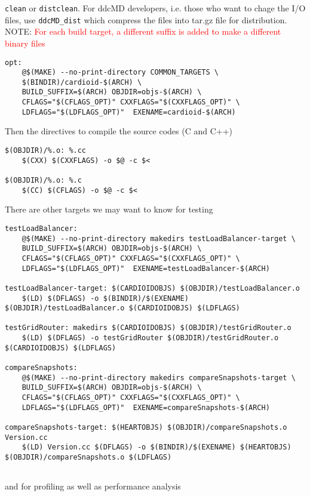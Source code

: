 \verb!clean! or \verb!distclean!. For ddcMD developers, i.e. those who want to
chage the I/O files, use \verb!ddcMD_dist! which compress the files into tar.gz
file for distribution. NOTE: \textcolor{red}{For each build target, a different
suffix is added to make a different binary files}
\begin{verbatim}
opt:
    @$(MAKE) --no-print-directory COMMON_TARGETS \
    $(BINDIR)/cardioid-$(ARCH) \
    BUILD_SUFFIX=$(ARCH) OBJDIR=objs-$(ARCH) \
    CFLAGS="$(CFLAGS_OPT)" CXXFLAGS="$(CXXFLAGS_OPT)" \
    LDFLAGS="$(LDFLAGS_OPT)"  EXENAME=cardioid-$(ARCH)
\end{verbatim}
Then the directives to compile the source codes (C and C++)
\begin{verbatim}
$(OBJDIR)/%.o: %.cc
    $(CXX) $(CXXFLAGS) -o $@ -c $<

$(OBJDIR)/%.o: %.c
    $(CC) $(CFLAGS) -o $@ -c $<
\end{verbatim}
There are other targets we may want to know for testing
\begin{verbatim}
testLoadBalancer:
    @$(MAKE) --no-print-directory makedirs testLoadBalancer-target \
    BUILD_SUFFIX=$(ARCH) OBJDIR=objs-$(ARCH) \
    CFLAGS="$(CFLAGS_OPT)" CXXFLAGS="$(CXXFLAGS_OPT)" \
    LDFLAGS="$(LDFLAGS_OPT)"  EXENAME=testLoadBalancer-$(ARCH)

testLoadBalancer-target: $(CARDIOIDOBJS) $(OBJDIR)/testLoadBalancer.o
    $(LD) $(DFLAGS) -o $(BINDIR)/$(EXENAME) $(OBJDIR)/testLoadBalancer.o $(CARDIOIDOBJS) $(LDFLAGS)

testGridRouter: makedirs $(CARDIOIDOBJS) $(OBJDIR)/testGridRouter.o
    $(LD) $(DFLAGS) -o testGridRouter $(OBJDIR)/testGridRouter.o $(CARDIOIDOBJS) $(LDFLAGS)

compareSnapshots: 
    @$(MAKE) --no-print-directory makedirs compareSnapshots-target \
    BUILD_SUFFIX=$(ARCH) OBJDIR=objs-$(ARCH) \
    CFLAGS="$(CFLAGS_OPT)" CXXFLAGS="$(CXXFLAGS_OPT)" \
    LDFLAGS="$(LDFLAGS_OPT)"  EXENAME=compareSnapshots-$(ARCH)

compareSnapshots-target: $(HEARTOBJS) $(OBJDIR)/compareSnapshots.o Version.cc
    $(LD) Version.cc $(DFLAGS) -o $(BINDIR)/$(EXENAME) $(HEARTOBJS) $(OBJDIR)/compareSnapshots.o $(LDFLAGS)
 
\end{verbatim}
and for profiling as well as performance analysis
